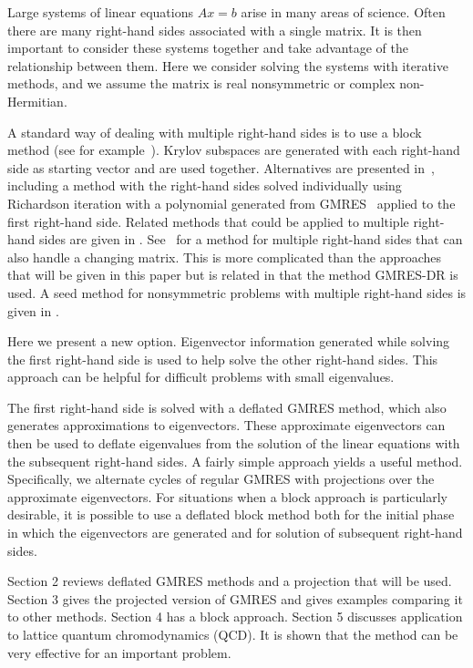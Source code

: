 \documentclass[final]{siamltex}
\begin{document}
Large systems of linear equations $Ax=b$ arise in many areas of science.  Often
there are many right-hand sides associated with a single matrix.  It
is then important to consider these systems together and take advantage of the
relationship between them.  Here we consider solving the systems with iterative methods, and we assume the matrix is real nonsymmetric or complex non-Hermitian.

A standard way of dealing with multiple right-hand sides is to use a
block method (see for example~\cite{OL80,Sa96,FrMa,SiGa96B,ChSa}).  Krylov subspaces are generated with each right-hand side as starting vector and are used together.  Alternatives are presented in~\cite{SiGa,SiGa96}, including a method with the right-hand sides solved individually using Richardson iteration with a polynomial generated from GMRES~\cite{SaSc} applied to the first right-hand side.  Related methods that could be applied to multiple right-hand sides are given in \cite{NaReTr, StVa, CaRe}.  See~\cite{PadeStMaJoMa} for a method for multiple right-hand sides that can also handle a changing matrix.  This is more complicated than the approaches that will be given in this paper but is related in that the method GMRES-DR is used.  A seed method for nonsymmetric problems with multiple right-hand sides is given in \cite{KiMiRa}.  

Here we present a new option.  Eigenvector information generated while solving the first right-hand side is used to help solve the other right-hand sides.  This approach can be helpful for difficult problems with small eigenvalues.

The first right-hand side is solved with a deflated GMRES method, which also generates approximations to eigenvectors.  These approximate eigenvectors can then be used to deflate eigenvalues from the solution of the linear equations with the subsequent right-hand sides.  A fairly simple approach yields a useful method.  Specifically, we alternate cycles of regular GMRES with projections over the approximate eigenvectors.   For situations when a block approach is particularly desirable, it is possible to use a deflated block method both for the initial phase in which the eigenvectors are generated and for solution of subsequent right-hand sides.

Section 2 reviews deflated GMRES methods and a projection that will be used. 
Section 3 gives the projected version of GMRES and gives examples comparing it to other methods.  Section 4 has a block approach.  Section 5 discusses application to lattice quantum chromodynamics (QCD).  It is shown that the method can be very effective for an important problem.
\end{document}
